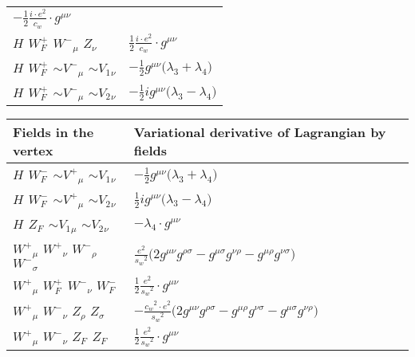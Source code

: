 \begin{center}
\begin{tabular}{|l|l|}
	$-\frac{1}{2}\frac{ i \cdot e{}^2 }{ c_w}\cdot g^{\mu \nu} $\\[2mm]
${H}_{}$ \phantom{-} $W^+_F{}_{}$ \phantom{-} $W^-{}_{\mu }$ \phantom{-} ${Z}_{\nu }$ \phantom{-}  &
	$\frac{1}{2}\frac{ i \cdot e{}^2 }{ c_w}\cdot g^{\mu \nu} $\\[2mm]
${H}_{}$ \phantom{-} $W^+_F{}_{}$ \phantom{-} $\sim V^-{}_{\mu }$ \phantom{-} $\sim V_1{}_{\nu }$ \phantom{-}  &
	$-\frac{1}{2}g^{\mu \nu} \big( \lambda_3+ \lambda_4\big)$\\[2mm]
${H}_{}$ \phantom{-} $W^+_F{}_{}$ \phantom{-} $\sim V^-{}_{\mu }$ \phantom{-} $\sim V_2{}_{\nu }$ \phantom{-}  &
	$-\frac{1}{2} ig^{\mu \nu} \big( \lambda_3- \lambda_4\big)$\\ \hline
\end{tabular}

\begin{tabular}{|l|l|} \hline
Fields in the vertex & Variational derivative of Lagrangian by fields \\ \hline
${H}_{}$ \phantom{-} $W^-_F{}_{}$ \phantom{-} $\sim V^+{}_{\mu }$ \phantom{-} $\sim V_1{}_{\nu }$ \phantom{-}  &
	$-\frac{1}{2}g^{\mu \nu} \big( \lambda_3+ \lambda_4\big)$\\[2mm]
${H}_{}$ \phantom{-} $W^-_F{}_{}$ \phantom{-} $\sim V^+{}_{\mu }$ \phantom{-} $\sim V_2{}_{\nu }$ \phantom{-}  &
	$\frac{1}{2} ig^{\mu \nu} \big( \lambda_3- \lambda_4\big)$\\[2mm]
${H}_{}$ \phantom{-} $Z_F{}_{}$ \phantom{-} $\sim V_1{}_{\mu }$ \phantom{-} $\sim V_2{}_{\nu }$ \phantom{-}  &
	$- \lambda_4\cdot g^{\mu \nu} $\\[2mm]
$W^+{}_{\mu }$ \phantom{-} $W^+{}_{\nu }$ \phantom{-} $W^-{}_{\rho }$ \phantom{-} $W^-{}_{\sigma }$ \phantom{-}  &
	$\frac{ e{}^2 }{ s_w{}^2 }\big(2g^{\mu \nu} g^{\rho \sigma} -g^{\mu \sigma} g^{\nu \rho} -g^{\mu \rho} g^{\nu \sigma} \big)$\\[2mm]
$W^+{}_{\mu }$ \phantom{-} $W^+_F{}_{}$ \phantom{-} $W^-{}_{\nu }$ \phantom{-} $W^-_F{}_{}$ \phantom{-}  &
	$\frac{1}{2}\frac{ e{}^2 }{ s_w{}^2 }\cdot g^{\mu \nu} $\\[2mm]
$W^+{}_{\mu }$ \phantom{-} $W^-{}_{\nu }$ \phantom{-} ${Z}_{\rho }$ \phantom{-} ${Z}_{\sigma }$ \phantom{-}  &
	$-\frac{ c_w{}^2  \cdot e{}^2 }{ s_w{}^2 }\big(2g^{\mu \nu} g^{\rho \sigma} -g^{\mu \rho} g^{\nu \sigma} -g^{\mu \sigma} g^{\nu \rho} \big)$\\[2mm]
$W^+{}_{\mu }$ \phantom{-} $W^-{}_{\nu }$ \phantom{-} $Z_F{}_{}$ \phantom{-} $Z_F{}_{}$ \phantom{-}  &
	$\frac{1}{2}\frac{ e{}^2 }{ s_w{}^2 }\cdot g^{\mu \nu} $\\[2mm]

\end{tabular}
\end{center}
